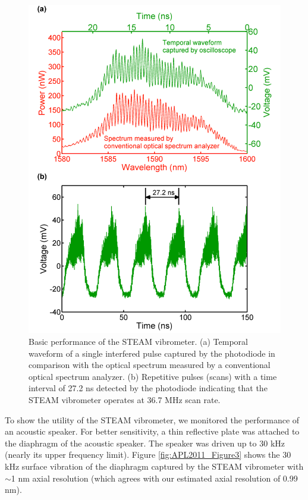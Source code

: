 \begin{figure}[htb!]
\centering
\includegraphics[scale=1]{APL2011/Figure2.png}
\caption{Basic performance of the STEAM vibrometer. (a) Temporal waveform of a single interfered pulse captured by the photodiode in comparison with the optical spectrum measured by a conventional optical spectrum analyzer. (b) Repetitive pulses (scans) with a time interval of 27.2 ns detected by the photodiode indicating that the STEAM vibrometer operates at 36.7 MHz scan rate.}
\label{fig:APL2011_Figure2}
\end{figure}

To show the utility of the STEAM vibrometer, we monitored the performance of an acoustic speaker. For better sensitivity, a thin reflective plate was attached to the diaphragm of the acoustic speaker. The speaker was driven up to 30 kHz (nearly its upper frequency limit). Figure \ref{fig:APL2011_Figure3} shows the 30 kHz surface vibration of the diaphragm captured by the STEAM vibrometer with $\sim$1 nm axial resolution (which agrees with our estimated axial resolution of 0.99 nm).


